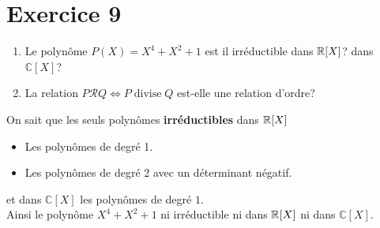 \documentclass{report}
\begin{document}
\section{Exercice 9}
\newcommand{\Cc}{\mathbb{C}}
\qs{}
{
\begin{enumerate}
  \item Le polynôme $P(X) = X^4 + X^2 + 1$ est il irréductible  dans $\mathbb{R}[X]$?
dans $\Cc[X]$?
\item La relation $P\mathcal{R} Q \iff P\; \text{divise}\; Q$  est-elle une
relation d'ordre?
\end{enumerate}
}
\begin{myproof}
  On sait que les seuls polynômes \textbf{irréductibles} dans $\mathbb{R}[X]$
  \begin{itemize}
    \item Les polynômes de degré 1.
    \item Les polynômes de degré 2 avec un déterminant négatif.
  \end{itemize}
  et dans $\Cc[X]$ les polynômes de degré $1$.\\

  Ainsi le polynôme $X^4 + X^2 + 1$ ni irréductible ni dans $\mathbb{R}[X]$ ni dans $\Cc[X]$.


\end{myproof}

\end{document}

